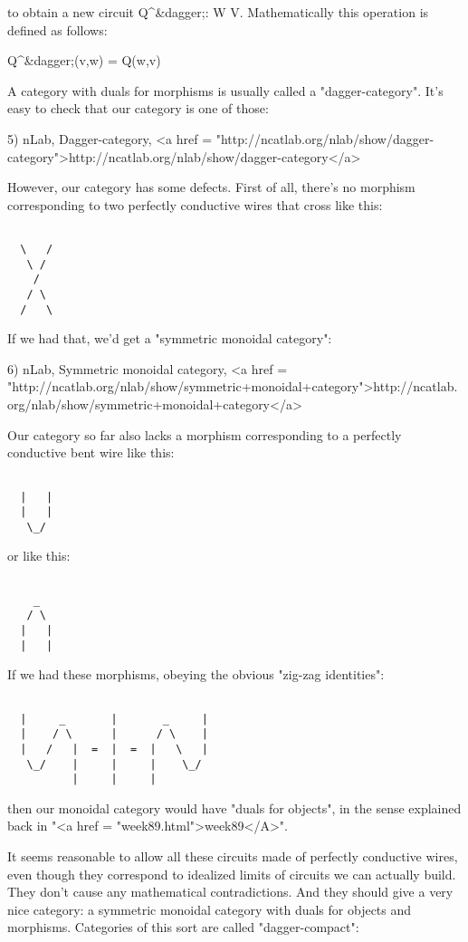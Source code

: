 to obtain a new circuit Q^{&dagger;}: W \to  V.
Mathematically this operation is defined as follows:

Q^{&dagger;}(v,w) = Q(w,v)

A category with duals for morphisms is usually called a
"dagger-category".  It's easy to check that our category is
one of those:

5) nLab, Dagger-category, <a href = "http://ncatlab.org/nlab/show/dagger-category">http://ncatlab.org/nlab/show/dagger-category</a>

However, our category has some defects.  First of all, there's no
morphism corresponding to two perfectly conductive wires that cross
like this:


\begin{verbatim}

  \   /
   \ /
    /
   / \
  /   \
\end{verbatim}
    
If we had that, we'd get a "symmetric monoidal category":

6) nLab, Symmetric monoidal category, 
<a href = "http://ncatlab.org/nlab/show/symmetric+monoidal+category">http://ncatlab.org/nlab/show/symmetric+monoidal+category</a>

Our category so far also lacks a morphism corresponding to a perfectly
conductive bent wire like this:


\begin{verbatim}

  |   |
  |   |
   \_/
\end{verbatim}
    

or like this:


\begin{verbatim}

    _
   / \
  |   |
  |   |
\end{verbatim}
    

If we had these morphisms, obeying the obvious "zig-zag identities":


\begin{verbatim}

  |     _       |       _     |
  |    / \      |      / \    |
  |   /   |  =  |  =  |   \   |
   \_/    |     |     |    \_/
          |     |     |
\end{verbatim}
    
then our monoidal category would have "duals for objects", in the
sense explained back in "<a href = "week89.html">week89</A>".  

It seems reasonable to allow all these circuits made of perfectly
conductive wires, even though they correspond to idealized limits of
circuits we can actually build.  They don't cause any mathematical
contradictions.  And they should give a very nice category: a
symmetric monoidal category with duals for objects and morphisms.
Categories of this sort are called "dagger-compact":

